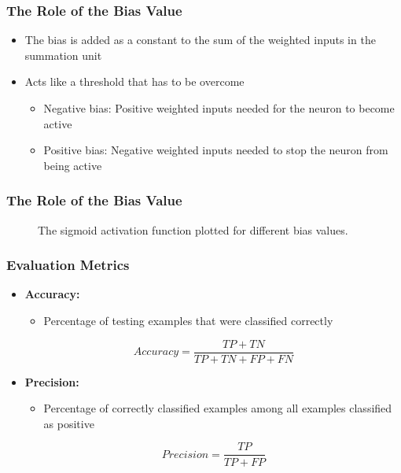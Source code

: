 \begin{frame}
  \frametitle{The Role of the Bias Value}
  \begin{itemize}
    \item The bias is added as a constant to the sum of the weighted
      inputs in the summation unit
    \item Acts like a threshold that has to be overcome
      \begin{itemize}
        \item Negative bias: Positive weighted inputs needed for the
          neuron to become active
        \item Positive bias: Negative weighted inputs needed to stop
          the neuron from being active
      \end{itemize}
  \end{itemize}
\end{frame}

\begin{frame}
  \frametitle{The Role of the Bias Value}
  \begin{figure}
    \resizebox{.6\textwidth}{!}{}
    \caption{The sigmoid activation function plotted for different bias values.}
  \end{figure}
\end{frame}

\begin{frame}
  \frametitle{Evaluation Metrics}
  \begin{itemize}
    \item \textbf{Accuracy:}
      \begin{itemize}
        \item Percentage of testing examples that were classified correctly
      \end{itemize}
      \begin{equation}
        Accuracy = \frac{TP + TN}{TP + TN + FP + FN}
      \end{equation}
    \item \textbf{Precision:}
      \begin{itemize}
        \item Percentage of correctly classified examples among all
          examples classified as positive
      \end{itemize}
      \begin{equation}
        Precision = \frac{TP}{TP + FP}
      \end{equation}
  \end{itemize}
\end{frame}

